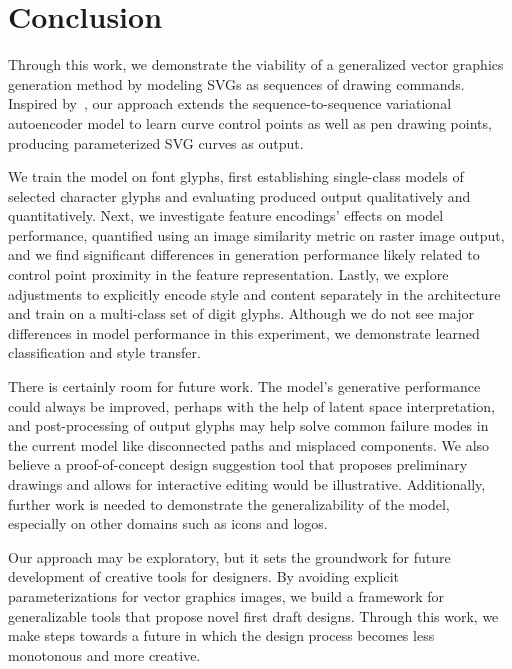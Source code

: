 \chapter{Conclusion}
Through this work, we demonstrate the viability of a generalized vector graphics generation method by modeling SVGs as sequences of drawing commands.
Inspired by~\cite{ha2017neural}, our approach extends the sequence-to-sequence variational autoencoder model to learn curve control points as well as pen drawing points, producing parameterized SVG curves as output.

We train the model on font glyphs, first establishing single-class models of selected character glyphs and evaluating produced output qualitatively and quantitatively.
Next, we investigate feature encodings' effects on model performance, quantified using an image similarity metric on raster image output, and we find significant differences in generation performance likely related to control point proximity in the feature representation.
Lastly, we explore adjustments to explicitly encode style and content separately in the architecture and train on a multi-class set of digit glyphs.
Although we do not see major differences in model performance in this experiment, we demonstrate learned classification and style transfer.

There is certainly room for future work.
The model's generative performance could always be improved, perhaps with the help of latent space interpretation, and post-processing of output glyphs may help solve common failure modes in the current model like disconnected paths and misplaced components.
We also believe a proof-of-concept design suggestion tool that proposes preliminary drawings and allows for interactive editing would be illustrative.
Additionally, further work is needed to demonstrate the generalizability of the model, especially on other domains such as icons and logos.

Our approach may be exploratory, but it sets the groundwork for future development of creative tools for designers.
By avoiding explicit parameterizations for vector graphics images, we build a framework for generalizable tools that propose novel first draft designs.
Through this work, we make steps towards a future in which the design process becomes less monotonous and more creative.
